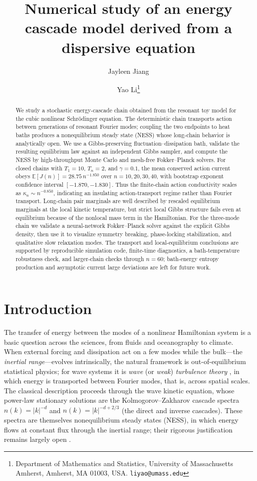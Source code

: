 \documentclass[11pt,a4paper]{article}
\title{Numerical study of an energy cascade model derived from a dispersive equation}
\author{Jayleen Jiang \and Yao Li\thanks{Department of Mathematics and Statistics, University of Massachusetts Amherst, Amherst, MA 01003, USA. \texttt{liyao@umass.edu}}}
\date{}
\theoremstyle{definition}
\newcommand{\E}{\mathbb{E}}
\numberwithin{equation}{section}   %
\begin{document}
\maketitle

\begin{abstract}
We study a stochastic energy-cascade chain obtained from the resonant toy model
for the cubic nonlinear Schr\"odinger equation. The deterministic chain
transports action between generations of resonant Fourier modes; coupling the
two endpoints to heat baths produces a nonequilibrium steady state (NESS) whose
long-chain behavior is analytically open. We use a Gibbs-preserving
fluctuation--dissipation bath, validate the resulting equilibrium law against
an independent Gibbs sampler, and compute the NESS by high-throughput Monte
Carlo and mesh-free Fokker--Planck solvers. For closed chains with
$T_1=10$, $T_n=2$, and $\gamma=0.1$, the mean conserved action current obeys
$\E[J(n)]=28.75\,n^{-1.850}$ over $n=10,20,30,40$, with bootstrap exponent
confidence interval $[-1.870,-1.830]$. Thus the finite-chain action
conductivity scales as $\kappa_n\sim n^{-0.850}$, indicating an insulating
action-transport regime rather than Fourier transport. Long-chain pair
marginals are well described by rescaled equilibrium marginals at the local
kinetic temperature, but strict local Gibbs structure fails even at
equilibrium because of the nonlocal mass term in the Hamiltonian. For the
three-mode chain we validate a neural-network Fokker--Planck solver against the
explicit Gibbs density, then use it to visualize symmetry breaking,
phase-locking stabilization, and qualitative slow relaxation modes. The
transport and local-equilibrium conclusions are supported by reproducible
simulation code, finite-time diagnostics, a bath-temperature robustness check,
and larger-chain checks through $n=60$; bath-energy entropy production and
asymptotic current large deviations are left for future work.
\end{abstract}


\section{Introduction}

The transfer of energy between the modes of a nonlinear Hamiltonian system is a
basic question across the sciences, from fluids and oceanography to climate.
When external forcing and dissipation act on a few modes while the bulk---the
\emph{inertial range}---evolves intrinsically, the natural framework is
out-of-equilibrium statistical physics; for wave systems it is \emph{wave} (or
\emph{weak}) \emph{turbulence theory} \cite{Nazarenko}, in which energy is
transported between Fourier modes, that is, across spatial scales. The classical
description proceeds through the wave kinetic equation, whose power-law
stationary solutions are the Kolmogorov--Zakharov cascade spectra
$n(k)=|k|^{-d}$ and $n(k)=|k|^{-d+2/3}$ (the direct and inverse cascades). These
spectra are themselves nonequilibrium steady states (NESS), in which energy
flows at constant flux through the inertial range; their rigorous justification
remains largely open \cite{HLNS}.
\end{document}
